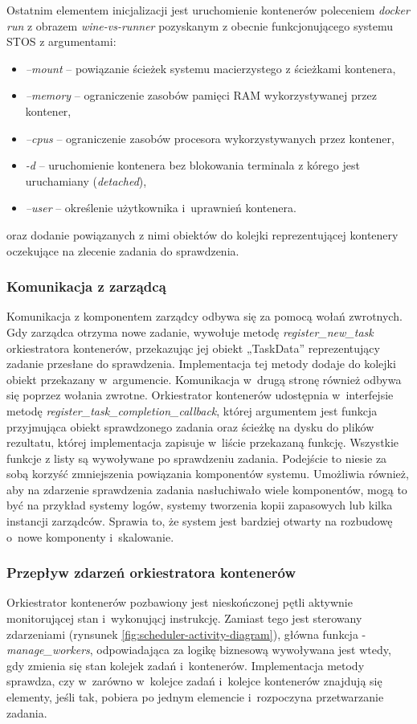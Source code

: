Ostatnim elementem inicjalizacji jest uruchomienie kontenerów poleceniem \textit{docker run} z obrazem \textit{wine-vs-runner} pozyskanym z obecnie funkcjonującego systemu STOS z argumentami:
\begin{itemize}
    \item \textit{--mount} -- powiązanie ścieżek systemu macierzystego z ścieżkami kontenera,
    \item \textit{--memory} -- ograniczenie zasobów pamięci RAM wykorzystywanej przez kontener,
    \item \textit{--cpus} -- ograniczenie zasobów procesora wykorzystywanych przez kontener,
    \item \textit{-d} -- uruchomienie kontenera bez blokowania terminala z kórego jest uruchamiany (\textit{detached}),
    \item \textit{--user} -- określenie użytkownika i~uprawnień kontenera.
\end{itemize}
oraz dodanie powiązanych z nimi obiektów do kolejki reprezentującej kontenery oczekujące na zlecenie zadania do sprawdzenia.

\subsubsection{Komunikacja z zarządcą}
Komunikacja z komponentem zarządcy odbywa się za pomocą wołań zwrotnych. Gdy zarządca otrzyma nowe zadanie, wywołuje metodę \textit{register\_new\_task} orkiestratora kontenerów, przekazując jej obiekt „TaskData” reprezentujący zadanie przesłane do sprawdzenia. Implementacja tej metody dodaje do kolejki obiekt przekazany w~argumencie. Komunikacja w~drugą stronę również odbywa się poprzez wołania zwrotne. Orkiestrator kontenerów udostępnia w~interfejsie metodę \textit{register\_task\_completion\_callback}, której argumentem jest funkcja przyjmująca obiekt sprawdzonego zadania oraz ścieżkę na dysku do plików rezultatu, której implementacja zapisuje w~liście przekazaną funkcję. Wszystkie funkcje z listy są wywoływane po sprawdzeniu zadania. Podejście to niesie za sobą korzyść zmniejszenia powiązania komponentów systemu. Umożliwia również, aby na zdarzenie sprawdzenia zadania nasłuchiwało wiele komponentów, mogą to być na przykład systemy logów, systemy tworzenia kopii zapasowych lub kilka instancji zarządców. Sprawia to, że system jest bardziej otwarty na rozbudowę o~nowe komponenty i~skalowanie.

\subsubsection{Przepływ zdarzeń orkiestratora kontenerów}
Orkiestrator kontenerów pozbawiony jest nieskończonej pętli aktywnie monitorującej stan i~wykonującj instrukcję. Zamiast tego jest sterowany zdarzeniami (rynsunek \ref{fig:scheduler-activity-diagram}), główna funkcja - \textit{manage\_workers}, odpowiadająca za logikę biznesową wywoływana jest wtedy, gdy zmienia się stan kolejek zadań i~kontenerów. Implementacja metody sprawdza, czy w~zarówno w~kolejce zadań i~kolejce kontenerów znajdują się elementy, jeśli tak, pobiera po jednym elemencie i~rozpoczyna przetwarzanie zadania.

